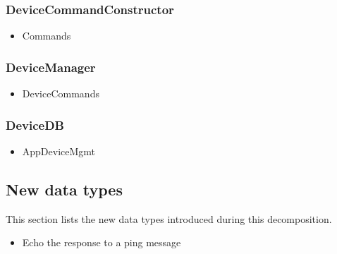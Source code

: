     \subsubsection{DeviceCommandConstructor}
        \begin{itemize}
            \item Commands
        \end{itemize}

    \subsubsection{DeviceManager}
        \begin{itemize}
            \item DeviceCommands
        \end{itemize}

    \subsubsection{DeviceDB}
        \begin{itemize}
            \item AppDeviceMgmt
        \end{itemize}


\subsection*{New data types}
    This section lists the new data types introduced during this decomposition.

    \begin{itemize}
        \item Echo the response to a ping message
    \end{itemize}
